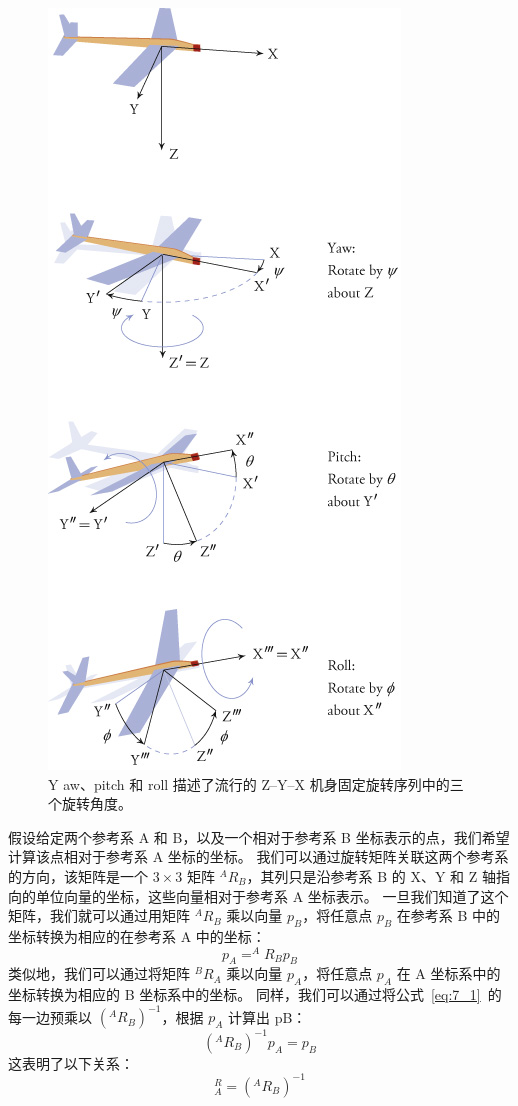 \begin{figure}[!htb]
	\centering
	\includegraphics[width=0.5\linewidth]{chap7/7_12}
	\caption{Y aw、pitch 和 roll 描述了流行的 Z–Y–X 机身固定旋转序列中的三个旋转角度。 \label{fig:7_12}}
\end{figure}


假设给定两个参考系 A 和 B，以及一个相对于参考系 B 坐标表示的点，我们希望计算该点相对于参考系 A 坐标的坐标。
我们可以通过旋转矩阵关联这两个参考系的方向，该矩阵是一个 $3\times3$ 矩阵 $^AR_B$，其列只是沿参考系 B 的 X、Y 和 Z 轴指向的单位向量的坐标，这些向量相对于参考系 A 坐标表示。
一旦我们知道了这个矩阵，我们就可以通过用矩阵 $^AR_B$ 乘以向量 $p_B$，将任意点 $p_B$ 在参考系 B 中的坐标转换为相应的在参考系 A 中的坐标：
%
\begin{equation}
	p_A = ^A R_B p_B
	\label{eq:7_1}
\end{equation}
%
类似地，我们可以通过将矩阵 $^BR_A$ 乘以向量 $p_A$，将任意点 $p_A$ 在 A 坐标系中的坐标转换为相应的 B 坐标系中的坐标。
同样，我们可以通过将公式~\ref{eq:7_1}~的每一边预乘以 $(^AR_B)^{−1}$，根据 $p_A$ 计算出 pB：
%
\begin{equation}
	( ^A R_B ) ^{-1} p_A = p_B
	\label{eq:7_2}
\end{equation}
%
这表明了以下关系：
%
\begin{equation}
	^R_A = ( ^A R_B ) ^{-1}
	\label{eq_7_3}
\end{equation}


